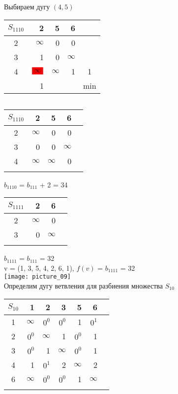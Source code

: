 \documentclass[12pt]{article}
\begin{document}
Выбираем дугу $(4,5)$

\begin{flushleft}
\begin{tabular}{c||rrr||c}
 $S_{1110}$ & 2  & 5 & 6 & \\
\hline
\hline
2 &  $\infty$ &0& 0 & \\
3 &  1   & 0 & $\infty$ & \\
4 &  $\colorbox{red}{$\infty$}$   & $\infty$ & 1 & 1\\
\hline
\hline
 & 1 &  &  & min \\
\end{tabular}
$\qquad $ 
\begin{tabular}{c||rrr||c}
 $S_{1110}$ & 2  & 5 & 6 & \\
\hline
\hline
2 &  $\infty$ &0& 0 & \\
3 &  0   & 0 & $\infty$ & \\
4 &  $\infty$  & $\infty$ & 0 & \\
\hline
\hline
 & &  &  & \\
\end{tabular}
\end{flushleft}

$b_{1110}$ = $b_{111}$ + 2 = 34\\

\begin{flushleft}
\begin{tabular}{c||rr||c}
 $S_{1111}$ & 2   & 6 & \\
\hline
\hline
2 &  $\infty$ & 0 & \\
3 &  0   &  $\infty$ & \\
\hline
\hline
 & &  & \\
\end{tabular}
\end{flushleft}

$b_{1111}$ = $b_{111}$ = 32\\

v = (1, 3, 5, 4, 2, 6, 1), $f(v)$ = $b_{1111}$  = 32\\

\texttt{[image: picture\_09]}\\

Определим дугу ветвления для разбиения множества $S_{10}$\\

\begin{flushleft}
\begin{tabular}{c||rrrrr||c}
$S_{10}$ & 1 & 2 & 3 & 5 & 6 & \\
\hline
\hline
1 & $\infty$ & $0^0$ & $0^0$  & 1 & $0^1$ & \\
2 & $0^0$ & $\infty$ & 1  & $0^0$ & 1 & \\
3 & $0^0$ & 1 & $\infty$  & $0^0$ & 1 & \\
4 & 1 & $0^1$ & 2  & $\infty$ & 2 & \\
6 & $\infty$ & $0^0$ & $0^0$  & 1 & $\infty$ & \\
\hline
\hline
 &  &  &  &  & \\
\end{tabular}
\end{flushleft}
\end{document}
